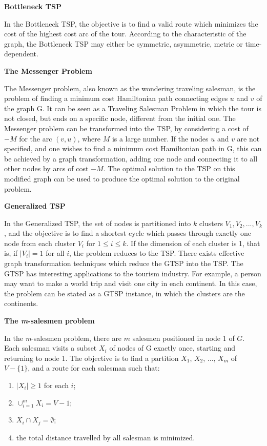 \textbf{Bottleneck TSP}

In the Bottleneck TSP, the objective is to find a valid route which minimizes the cost of the highest cost arc of the tour. According to the characteristic of the graph,
the Bottleneck TSP may either be symmetric, asymmetric, metric or time-dependent.


\textbf{The Messenger Problem}

The Messenger problem, also known as the wondering traveling salesman, is the problem of finding a minimum cost Hamiltonian path connecting edges $u$ and $v$ of the graph G. It can be seen as a Traveling Salesman Problem in which the tour is not closed, but ends on a specific node, different from the initial one. The Messenger problem can be transformed into the TSP, by considering a cost of $-M$ for the arc $(v, u)$, where $M$ is a large number. If the nodes $u$ and $v$ are not specified, and one wishes to find a minimum cost Hamiltonian path in G, this can be achieved by a graph transformation, adding one node and connecting it to all other nodes by arcs of cost $-M$. The optimal solution to the TSP on this modified graph can be used to produce the optimal solution to the original problem.


\textbf{Generalized TSP}

In the Generalized TSP, the set of nodes is partitioned into $k$ clusters  $V_{1}, V_{2}, ..., V_{k}$, and the objective is to find a shortest cycle which passes through exactly one node from each cluster $V_{i}$ for $ 1 \leq i \leq k$. If the dimension of each cluster is 1, that is, if $|V_{i}| = 1$ for all $i$, the problem reduces to the TSP. There exists effective graph transformation techniques which reduce the GTSP into the TSP. The GTSP has interesting applications to the tourism industry. For example, a person may want to make a world trip and visit one city in each continent. In this case, the problem can be stated as a GTSP instance, in which the clusters are the continents.

\textbf{The \textit{m}-salesmen problem}

In the \textit{m}-salesmen problem, there are $m$ salesmen positioned in node 1 of $G$. Each salesman visits a subset $X_{i}$ of nodes of G exactly once, starting and returning to node 1. The objective is to find a partition $X_{1}$, $X_{2}$, ..., $X_{m}$ of $V-\{1\}$, and a route for each salesman such that:

\begin{enumerate}
  \item $|X_{i}| \geq 1$ for each $i$;
  \item $\cup_{i=1}^{m} X_{i}=V-{1}$;
  \item $X_{i} \cap X_{j} = \emptyset$;
  \item the total distance travelled by all salesman is minimized.
\end{enumerate}   




